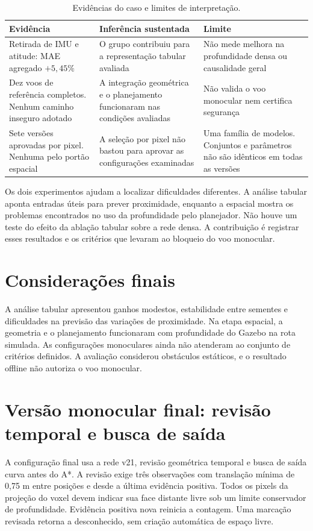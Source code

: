 \begin{table}[htb]
\centering
\caption{Evidências do caso e limites de interpretação.}
\label{tab:evidencias-alcance}
\begin{tabular}{p{}p{}p{}}
\hline
\textbf{Evidência} & \textbf{Inferência sustentada} & \textbf{Limite} \\
\hline
Retirada de IMU e atitude: MAE agregado $+5,45\%$ & O grupo contribuiu para a representação tabular avaliada & Não mede melhora na profundidade densa ou causalidade geral \\
Dez voos de referência completos. Nenhum caminho inseguro adotado & A integração geométrica e o planejamento funcionaram nas condições avaliadas & Não valida o voo monocular nem certifica segurança \\
Sete versões aprovadas por pixel. Nenhuma pelo portão espacial & A seleção por pixel não bastou para aprovar as configurações examinadas & Uma família de modelos. Conjuntos e parâmetros não são idênticos em todas as versões \\
\hline
\end{tabular}
\end{table}

Os dois experimentos ajudam a localizar dificuldades diferentes. A análise tabular aponta entradas úteis para prever proximidade, enquanto a espacial mostra os problemas encontrados no uso da profundidade pelo planejador. Não houve um teste do efeito da ablação tabular sobre a rede densa. A contribuição é registrar esses resultados e os critérios que levaram ao bloqueio do voo monocular.

\section{Considerações finais}

A análise tabular apresentou ganhos modestos, estabilidade entre sementes e dificuldades na previsão das variações de proximidade. Na etapa espacial, a geometria e o planejamento funcionaram com profundidade do Gazebo na rota simulada. As configurações monoculares ainda não atenderam ao conjunto de critérios definidos. A avaliação considerou obstáculos estáticos, e o resultado offline não autoriza o voo monocular.


\section{Versão monocular final: revisão temporal e busca de saída}\label{sec:monocular-final}
A configuração final usa a rede v21, revisão geométrica temporal e busca de saída curva antes do A*. A revisão exige três observações com translação mínima de 0,75 m entre posições e desde a última evidência positiva. Todos os pixels da projeção do voxel devem indicar sua face distante livre sob um limite conservador de profundidade. Evidência positiva nova reinicia a contagem. Uma marcação revisada retorna a desconhecido, sem criação automática de espaço livre.

